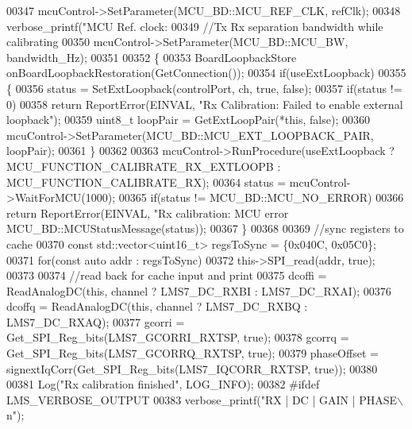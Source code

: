 \begin{DoxyCode}
{{{{{{{{{{{{{{00347     mcuControl->SetParameter(MCU_BD::MCU_REF_CLK, refClk);
00348     verbose_printf(\textcolor{stringliteral}{"MCU Ref. clock: %
00349     \textcolor{comment}{//Tx Rx separation bandwidth while calibrating}
00350     mcuControl->SetParameter(MCU_BD::MCU_BW, bandwidth\_Hz);
00351 
00352     \{
00353         BoardLoopbackStore onBoardLoopbackRestoration(GetConnection());
00354         \textcolor{keywordflow}{if}(useExtLoopback)
00355         \{
00356             status = SetExtLoopback(controlPort, ch, \textcolor{keyword}{true}, \textcolor{keyword}{false});
00357             \textcolor{keywordflow}{if}(status != 0)
00358                 \textcolor{keywordflow}{return} ReportError(EINVAL, \textcolor{stringliteral}{"Rx Calibration: Failed to enable external loopback"});
00359             uint8\_t loopPair = GetExtLoopPair(*\textcolor{keyword}{this}, \textcolor{keyword}{false});
00360             mcuControl->SetParameter(MCU_BD::MCU_EXT_LOOPBACK_PAIR, loopPair);
00361         \}
00362 
00363         mcuControl->RunProcedure(useExtLoopback ? 
      MCU_FUNCTION_CALIBRATE_RX_EXTLOOPB : MCU_FUNCTION_CALIBRATE_RX);
00364         status = mcuControl->WaitForMCU(1000);
00365         \textcolor{keywordflow}{if}(status != MCU_BD::MCU_NO_ERROR)
00366             \textcolor{keywordflow}{return} ReportError(EINVAL, \textcolor{stringliteral}{"Rx calibration: MCU error %
      MCU\_BD::MCUStatusMessage(status));
00367     \}
00368 
00369     \textcolor{comment}{//sync registers to cache}
00370     \textcolor{keyword}{const} std::vector<uint16\_t> regsToSync = \{0x040C, 0x05C0\};
00371     \textcolor{keywordflow}{for}(\textcolor{keyword}{const} \textcolor{keyword}{auto} addr : regsToSync)
00372         this->SPI_read(addr, \textcolor{keyword}{true});
00373 
00374     \textcolor{comment}{//read back for cache input and print}
00375     dcoffi = ReadAnalogDC(\textcolor{keyword}{this}, channel ? LMS7_DC_RXBI : LMS7_DC_RXAI);
00376     dcoffq = ReadAnalogDC(\textcolor{keyword}{this}, channel ? LMS7_DC_RXBQ : LMS7_DC_RXAQ);
00377     gcorri = Get_SPI_Reg_bits(LMS7_GCORRI_RXTSP, \textcolor{keyword}{true});
00378     gcorrq = Get_SPI_Reg_bits(LMS7_GCORRQ_RXTSP, \textcolor{keyword}{true});
00379     phaseOffset = signextIqCorr(Get_SPI_Reg_bits(LMS7_IQCORR_RXTSP, \textcolor{keyword}{true}));
00380 
00381     Log(\textcolor{stringliteral}{"Rx calibration finished"}, LOG\_INFO);
00382 \textcolor{preprocessor}{#ifdef LMS\_VERBOSE\_OUTPUT}
00383     verbose_printf(\textcolor{stringliteral}{"RX | DC  | GAIN | PHASE\(\backslash\)n"});
}}}}}}}}}}}}}}}}
\end{DoxyCode}
